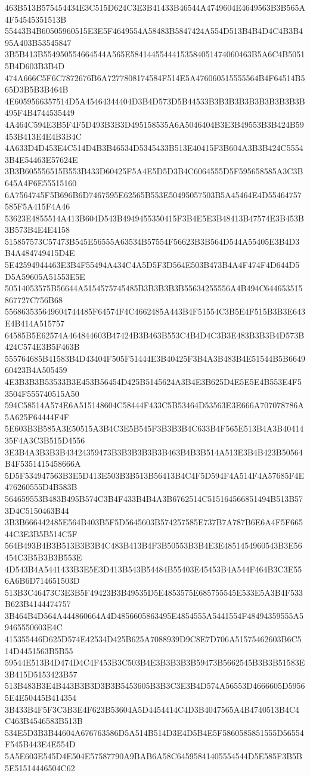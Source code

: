 {{{{{{{{{{{{{{{{{{{{{463B513B575454434E3C515D624C3E3B41433B46544A4749604E4649563B3B565A4F54545351513B
55443B4B60505960515E3E5F4649554A58483B5847424A554D513B4B4D4C4B3B495A403B53545847
3B5B413B554950554664544A565E58414455444153584051474060463B5A6C4B50515B4D603B3B4D
474A666C5F6C7872676B6A7277808174584F514E5A476060515555564B4F64514B565D3B5B3B464B
4E6059566357514D5A45464344404D3B4D573D5B44533B3B3B3B3B3B3B3B3B3B495F4B4744535449
4A464C594E3B5F4F5D493B3B3D495158535A6A5046404B3E3B49553B3B424B59453B413E4E4B3B4C
4A633D4D453E4C514D4B3B46534D5345433B513E40415F3B604A3B3B424C55543B4E54463E57624E
3B3B605556515B553B433D60425F5A4E5D5D3B4C6064555D5F595658585A3C3B645A4F6E55515160
6A7564745F5B696B6D7467595E62565B553E50495057503B5A45464E4D55464757585F5A415F4A46
53623E4855514A413B604D543B4949455350415F3B4E5E3B48413B47574E3B453B3B573B4E4E4158
515857573C57473B545E56555A63534B57554F56623B3B564D544A55405E3B4D3B4A484749415D4E
5E42594944463E3B4F55494A434C4A5D5F3D564E503B473B4A4F474F4D644D5D5A59605A51553E5E
50514053575B56644A5154575745485B3B3B3B3B55634255556A4B494C644653515867727C756B68
556863535649604744485F64574F4C4662485A443B4F51554C3B5E4F515B3B3E643E4B414A515757
64585B5E62574A464844603B47424B3B463B553C4B4D4C3B3E483B3B3B4D573B424C574E3B5F463B
555764685B41583B4D43404F505F51444E3B40425F3B4A3B483B4E51544B5B664960423B4A505459
4E3B3B3B53533B3E453B56454D425B5145624A3B4E3B625D4E5E5E4B553E4F53504F555740515A50
594C58514A574E6A515148604C58444F433C5B53464D53563E3E666A707078786A5A625F64444F4F
5E603B3B585A3E50515A3B4C3E5B545F3B3B3B4C633B4F565E513B4A3B4041435F4A3C3B515D4556
3E3B4A3B3B3B43424359473B3B3B3B3B3B463B4B3B514A513E3B4B423B50564B4F5351415458666A
5D5F534947563B3E5D413E503B3B513B56413B4C4F5D594F4A514F4A57685F4E476260555D4B583B
564659553B483B495B574C3B4F433B4B4A3B6762514C515164566851494B513B573D4C5150463B44
3B3B666442485E564B403B5F5D5645603B574257585E737B7A787B6E6A4F5F66544C3E3B5B514C5F
564B493B4B3B513B3B3B4C483B413B4F3B50553B3B4E3E4851454960543B3E56454C3B5B3B3B553E
4D543B4A5441433B3E5E3D413B543B54484B55403E45453B4A544F464B3C3E556A6B6D714651503D
513B3C46473C3E3B5F49423B3B49535D5E4853575E685755545E533E5A3B4F533B623B4144474757
3B464B4D564A444860664A4D4856605863495E4854555A5441554F48494359555A59465550603E4C
415355446D625D574E42534D425B625A7088939D9C8E7D706A51575462603B6C514D4451563B5B55
59544E513B4D474D4C4F453B3C503B4E3B3B3B3B59473B5662545B3B3B51583E3B415D5153423B57
513B483B3E4B443B3B3D3B3B5453605B3B3C3E3B4D574A56553D4666605D59565E4E50445B414354
3B433B4F5F3C3B3E4F623B53604A5D4454414C4D3B4047565A4B4740513B4C4C463B4546583B513B
534E5D3B3B44604A676763586D5A514B514D3E4D5B4E5F5860585851555D56554F545B443E4E554D
5A5E603E545D4E504E57587790A9BAB6A58C64595841405554544D5E585F3B5B5E51514446504C62
}}}}}}}}}}}}}}}}}}}}}
